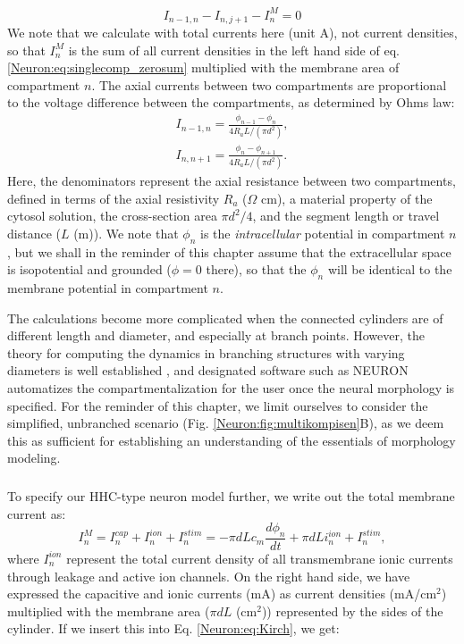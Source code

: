 \begin{equation}
I_{n-1,n} - I_{n,j+1} - I^M_n = 0
\label{Neuron:eq:Kirch}
\end{equation}
We note that we calculate with total currents here (unit A), not current densities, so that $I^M_n$ is the sum of all current densities in the left hand side of eq. \ref{Neuron:eq:singlecomp_zerosum} multiplied with the membrane area of compartment $n$. The axial currents between two compartments are proportional to the voltage difference between the compartments, as determined by Ohms law:
\begin{eqnarray}
I_{n-1,n} = \frac{\phi_{n-1}-\phi_n}{4 R_a L/(\pi d^2)}, \nonumber \\ 
I_{n,n+1} = \frac{\phi_{n}-\phi_{n+1}}{4 R_a L/(\pi d^2)}.
\label{Neuron:eq:axialcurrents}
\end{eqnarray}
Here, the denominators represent the axial resistance between two compartments, defined in terms of the axial resistivity $R_a$ ($\Omega$ cm), a material property of the cytosol solution, the cross-section area $\pi d^2/4$, and the segment length or travel distance ($L$ (m)). We note that $\phi_n$ is the \emph{intracellular} potential in compartment $n$, but we shall in the reminder of this chapter assume that the extracellular space is isopotential and grounded ($\phi = 0$ there), so that the $\phi_n$ will be identical to the membrane potential in compartment $n$.

The calculations become more complicated when the connected cylinders are of different length and diameter, and especially at branch points. However, the theory for computing the dynamics in branching structures with varying diameters is well established \cite{Rall1977,Rall1989}, and designated software such as NEURON \cite{Hines1997, Hines2009} automatizes the compartmentalization for the user once the neural morphology is specified. For the reminder of this chapter, we limit ourselves to consider the simplified, unbranched scenario (Fig. \ref{Neuron:fig:multikompisen}B), as we deem this as sufficient for establishing an understanding of the essentials of morphology modeling. 




\subsubsection{}
\label{sec:Neuron:Active_multicomp}

To specify our HHC-type neuron model further, we write out the total membrane current as:
\begin{equation}
I^M_n = I_n^{cap} + I_n^{ion} + I_n^{stim} = -\pi d L c_m \frac{d\phi_n}{dt} + \pi d L i_n^{ion} + I_n^{stim}, 
\label{Neuron:eq:Imemb}
\end{equation}
where $I_n^{ion}$ represent the total current density of all transmembrane ionic currents through leakage and active ion channels. On the right hand side, we have expressed the capacitive and ionic currents (mA) as current densities (mA/cm$^2$) multiplied with the membrane area ($\pi d L$ (cm$^2$)) represented by the sides of the cylinder. If we insert this into Eq. \ref{Neuron:eq:Kirch}, we get:

